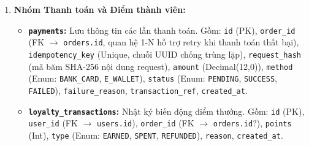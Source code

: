 \begin{enumerate}
    \item \textbf{Nhóm Thanh toán và Điểm thành viên:}
    \begin{itemize}
        \item \textbf{\texttt{payments}:} Lưu thông tin các lần thanh toán. Gồm: \texttt{id} (PK), \texttt{order\_id} (FK \(\to\) \texttt{orders.id}, quan hệ 1-N hỗ trợ retry khi thanh toán thất bại), \texttt{idempotency\_key} (Unique, chuỗi UUID chống trùng lặp), \texttt{request\_hash} (mã băm SHA-256 nội dung request), \texttt{amount} (Decimal(12,0)), \texttt{method} (Enum: \texttt{BANK\_CARD}, \texttt{E\_WALLET}), \texttt{status} (Enum: \texttt{PENDING}, \texttt{SUCCESS}, \texttt{FAILED}), \texttt{failure\_reason}, \texttt{transaction\_ref}, \texttt{created\_at}.
        \item \textbf{\texttt{loyalty\_transactions}:} Nhật ký biến động điểm thưởng. Gồm: \texttt{id} (PK), \texttt{user\_id} (FK \(\to\) \texttt{users.id}), \texttt{order\_id} (FK \(\to\) \texttt{orders.id}?), \texttt{points} (Int), \texttt{type} (Enum: \texttt{EARNED}, \texttt{SPENT}, \texttt{REFUNDED}), \texttt{reason}, \texttt{created\_at}.
    \end{itemize}
\end{enumerate}

